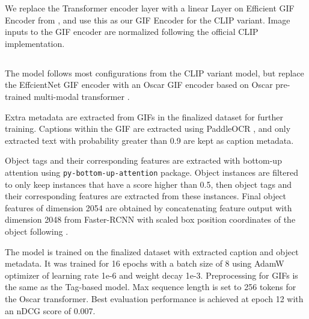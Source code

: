 We replace the Transformer encoder layer with a linear Layer on Efficient GIF Encoder from , and use this as our GIF Encoder for the CLIP variant. Image inputs to the GIF encoder are normalized following the official CLIP implementation.

\subsection{\pepe}

The \pepe model follows most configurations from the CLIP variant model, but replace the EffcientNet GIF encoder with an Oscar GIF encoder based on Oscar pre-trained multi-modal transformer \cite{li2020oscar}. 

Extra metadata are extracted from GIFs in the finalized dataset for further training. Captions within the GIF are extracted using PaddleOCR \cite{du2020paddleocr}, and only extracted text with probability greater than 0.9 are kept as caption metadata. 

Object tags and their corresponding features are extracted with bottom-up attention \cite{anderson2017up-down} using \texttt{py-bottom-up-attention} package. Object instances are filtered to only keep instances that have a score higher than 0.5, then object tags and their corresponding features are extracted from these instances. Final object features of dimension 2054 are obtained by concatenating feature output with dimension 2048 from Faster-RCNN with scaled box position coordinates of the object following \cite{li2020oscar}.

The \pepe model is trained on the finalized dataset with extracted caption and object metadata. It was trained for 16 epochs with a batch size of 8 using AdamW optimizer of learning rate 1e-6 and weight decay 1e-3. Preprocessing for GIFs is the same as the Tag-based model. Max sequence length is set to 256 tokens for the Oscar transformer. Best evaluation performance is achieved at epoch 12 with an nDCG score of 0.007.


